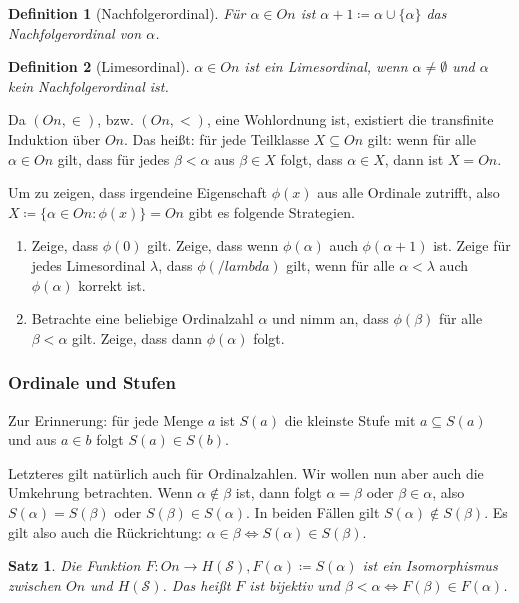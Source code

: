 \documentclass[german]{article}
\theoremstyle{break}
\theoremstyle{def_style}
\newtheorem{definition}{Definition}[section]
\theoremstyle{def_style}
\newtheorem{satz}{Satz}[section]
\theoremstyle{lemma_style}
\begin{document}
\begin{definition}[Nachfolgerordinal]
	Für $\alpha\in On$ ist $\alpha+1\coloneqq\alpha\cup \{\alpha\}$ das \textit{Nachfolgerordinal} von $\alpha$.
\end{definition}

\begin{definition}[Limesordinal]
	$\alpha\in On$ ist ein \textit{Limesordinal}, wenn $\alpha\neq\emptyset$ und $\alpha$ kein Nachfolgerordinal ist.
\end{definition}

Da $(On,\in)$, bzw. $(On,<)$, eine Wohlordnung ist, existiert die transfinite Induktion über $On$. Das heißt: für jede Teilklasse $X\subseteq On$ gilt: wenn für alle $\alpha\in On$ gilt, dass für jedes $\beta<\alpha$ aus $\beta\in X$ folgt, dass $\alpha\in X$, dann ist $X=On$.

Um zu zeigen, dass irgendeine Eigenschaft $\phi(x)$ aus alle Ordinale zutrifft, also $X\coloneqq\{\alpha\in On : \phi(x)\}=On$ gibt es folgende Strategien.
\begin{enumerate}
	\item Zeige, dass $\phi(0)$ gilt. Zeige, dass wenn $\phi(\alpha)$ auch $\phi(\alpha+1)$ ist. Zeige für jedes Limesordinal $\lambda$, dass $\phi(/lambda)$ gilt, wenn für alle $\alpha<\lambda$ auch $\phi(\alpha)$ korrekt ist.
	
	\item Betrachte eine beliebige Ordinalzahl $\alpha$ und nimm an, dass $\phi(\beta)$ für alle $\beta<\alpha$ gilt. Zeige, dass dann $\phi(\alpha)$ folgt.
\end{enumerate}

\subsubsection{Ordinale und Stufen}

Zur Erinnerung: für jede Menge $a$ ist $S(a)$ die kleinste Stufe mit $a\subseteq S(a)$ und aus $a\in b$ folgt $S(a)\in S(b)$.

Letzteres gilt natürlich auch für Ordinalzahlen. Wir wollen nun aber auch die Umkehrung betrachten. Wenn $\alpha\notin\beta$ ist, dann folgt $\alpha=\beta$ oder $\beta\in\alpha$, also $S(\alpha)=S(\beta)$ oder $S(\beta)\in S(\alpha)$. In beiden Fällen gilt $S(\alpha)\notin S(\beta)$. Es gilt also auch die Rückrichtung: $\alpha\in\beta \Leftrightarrow S(\alpha)\in S(\beta)$.

\begin{satz}
	Die Funktion $F:On \to H(\mathcal{S}), F(\alpha)\coloneqq S(\alpha)$ ist ein Isomorphismus zwischen $On$ und $H(\mathcal{S})$. Das heißt $F$ ist bijektiv und $\beta<\alpha \Leftrightarrow F(\beta)\in F(\alpha)$.
\end{satz}
\end{document}
